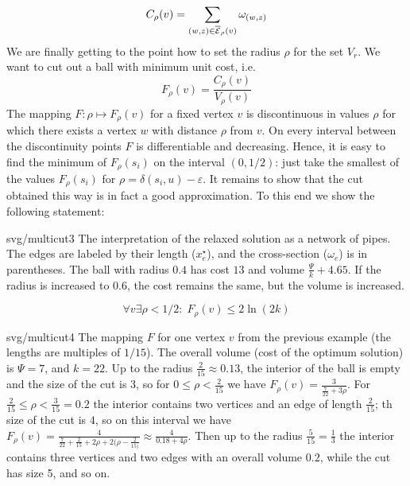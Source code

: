\noindent
\begin{minipage}[t]{0.5\textwidth-1cm}
\noindent
$$C_\rho(v)=\sum_{(w,z)\in\overline{\cal E}_\rho(v)}\omega_{(w,z)}$$
We are finally getting to the point how to set the radius $\rho$ for the set $V_r$. We want to cut out a ball 
with minimum unit cost, i.e.
$$F_\rho(v)=\frac{C_\rho(v)}{V_\rho(v)}$$
The mapping $F:\rho\mapsto F_\rho(v)$ for a fixed vertex $v$ is discontinuous in values  $\rho$
for which there exists a vertex $w$ with distance $\rho$ from $v$. On every interval between the discontinuity points
$F$ is differentiable and decreasing. Hence, it is easy to find the minimum of $F_\rho(s_i)$ on the interval
$(0,1/2)$: just take the smallest of the values $F_\rho(s_i)$ for $\rho=\delta(s_i,u)-\varepsilon$.
It remains to show that the cut obtained this way is in fact a good approximation. To this end we show
the following statement: 
\end{minipage}\hspace*{1cm}\begin{minipage}[t]{0.5\textwidth}
\begin{myfig}{0.7\textwidth}{svg/multicut3}
  The interpretation of the relaxed solution as a network of pipes. The edges are labeled by their
  length  ($x_e^\star$), and the cross-section  ($\omega_e$) is in parentheses. The ball with radius 
  $0.4$ has cost $13$ and volume  $\frac{\Psi}{k}+4.65$. If the radius is increased to $0.6$,
  the cost remains the same, but the volume is increased.
\end{myfig}
\end{minipage}
\noindent
\begin{equation}
\label{eq:cut1}
\forall v\exists\rho<1/2:\;F_\rho(v)\le2\ln(2k)
\end{equation}

\begin{myfig}{\textwidth}{svg/multicut4}
  The mapping $F$ for one vertex $v$ from the previous example (the lengths are multiples of $1/15$). 
  The overall volume (cost of the optimum solution) is $\Psi=7$, and $k=22$. Up to the radius  
  $\frac{2}{15}\approx 0.13$, the interior of the ball is empty and the size of the cut is 3, so 
  for $0\le\rho<\frac{2}{15}$ we have $F_\rho(v)=\frac{3}{\frac{7}{22}+3\rho}$. For 
  $\frac{2}{15}\le\rho<\frac{3}{15}=0.2$ the interior contains two vertices and an edge of length  $\frac{2}{15}$;
  th size of the cut is $4$, so on this interval we have 
  $F_\rho(v)=\frac{4}{\frac{7}{22}+\frac{2}{15}+2\rho+2(\rho-\frac{2}{15)}}\approx\frac{4}{0.18+4\rho}$. 
  Then up to the radius $\frac{5}{15}=\frac{1}{3}$ the interior contains three vertices and two edges with
  an overall volume $0.2$, while the cut has size 5, and so on.
\end{myfig}

